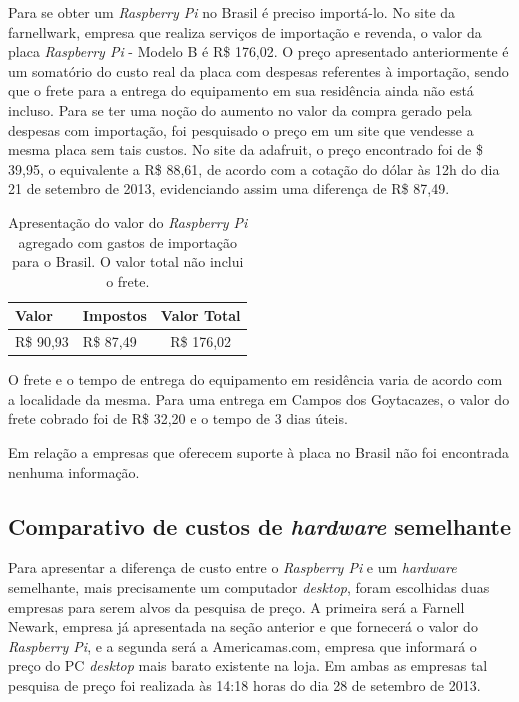 Para se obter um \textit{Raspberry Pi} no Brasil é preciso importá-lo. No site da farnellwark, empresa que realiza serviços de importação e revenda, o valor da placa \textit{Raspberry Pi} - Modelo B é R\$ 176,02. O preço apresentado anteriormente é um somatório do custo real da placa com despesas referentes à importação, sendo que o frete para a entrega do equipamento em sua residência ainda não está incluso. Para se ter uma noção do aumento no valor da compra gerado pela despesas com importação, foi pesquisado o preço em um site que vendesse a mesma placa sem tais custos. No site da adafruit, o preço encontrado foi de \$ 39,95, o equivalente a R\$ 88,61, de acordo com a cotação do dólar às 12h do dia 21 de setembro de 2013, evidenciando assim uma diferença de R\$ 87,49.

\begin{table}[!htpb]
 \centering
    \begin{tabular}{|l|p{3cm}|c|} 
    \hline
        \textbf{Valor} & \textbf{Impostos} & \textbf{Valor Total} \\
    \hline
        R\$ 90,93 & R\$ 87,49 & R\$ 176,02 \\
    \hline
    \end{tabular}
    \caption{Apresentação do valor do \textit{Raspberry Pi} agregado com gastos de importação para o Brasil. O valor total não inclui o frete.}
    \label{t_fixa}
\end{table}

O frete e o tempo de entrega do equipamento em residência varia de acordo com a localidade da mesma. Para uma entrega em Campos dos Goytacazes, o valor do frete cobrado foi de R\$ 32,20 e o tempo de 3 dias úteis.

Em relação a empresas que oferecem suporte à placa no Brasil não foi encontrada nenhuma informação.

\subsection{Comparativo de custos de \textit{hardware} semelhante}

Para apresentar a diferença de custo entre o \textit{Raspberry Pi} e um \textit{hardware} semelhante, mais precisamente um computador \textit{desktop}, foram escolhidas duas empresas para serem alvos da pesquisa de preço. A primeira será a Farnell Newark, empresa já apresentada na seção anterior e que fornecerá o valor do \textit{Raspberry Pi}, e a segunda será a Americamas.com, empresa que informará o preço do PC \textit{desktop} mais barato existente na loja. Em ambas as empresas tal pesquisa de preço foi realizada às 14:18 horas do dia 28 de setembro de 2013.

